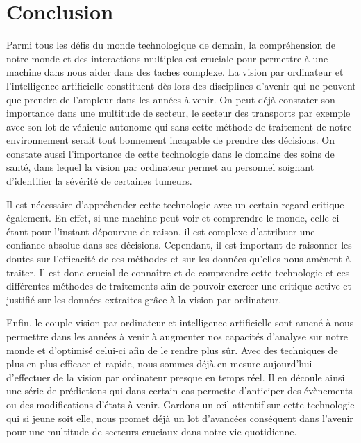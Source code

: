 \documentclass[a4paper,12pt]{article} %
\begin{document}
\section{Conclusion} %
Parmi tous les défis du monde technologique de demain, la compréhension de notre monde et des interactions multiples est cruciale pour permettre à une machine dans nous aider dans des taches complexe. La vision par ordinateur et l’intelligence artificielle constituent dès lors des disciplines d’avenir qui ne peuvent que prendre de l’ampleur dans les années à venir. On peut déjà constater son importance dans une multitude de secteur, le secteur des transports par exemple avec son lot de véhicule autonome qui sans cette méthode de traitement de notre environnement serait tout bonnement incapable de prendre des décisions. On constate aussi l’importance de cette technologie dans le domaine des soins de santé, dans lequel la vision par ordinateur permet au personnel soignant d’identifier la sévérité de certaines tumeurs. \newline
\par
	Il est nécessaire d’appréhender cette technologie avec un certain regard critique également. En effet, si une machine peut voir et comprendre le monde, celle-ci étant pour l’instant dépourvue de raison, il est complexe d’attribuer une confiance absolue dans ses décisions. Cependant, il est important de raisonner les doutes sur l’efficacité de ces méthodes et sur les données qu’elles nous amènent à traiter. Il est donc crucial de connaître et de comprendre cette technologie et ces différentes méthodes de traitements afin de pouvoir exercer une critique active et justifié sur les données extraites grâce à la vision par ordinateur. \newline
\par
	Enfin, le couple vision par ordinateur et intelligence artificielle sont amené à nous permettre dans les années à venir à augmenter nos capacités d’analyse sur notre monde et d’optimisé celui-ci afin de le rendre plus sûr. Avec des techniques de plus en plus efficace et rapide, nous sommes déjà en mesure aujourd’hui d’effectuer de la vision par ordinateur presque en temps réel. Il en découle ainsi une série de prédictions qui dans certain cas permette d’anticiper des évènements ou des modifications d’états à venir. Gardons un œil attentif sur cette technologie qui si jeune soit elle, nous promet déjà un lot d’avancées conséquent dans l’avenir pour une multitude de secteurs cruciaux dans notre vie quotidienne. 
\newpage

\nocite {*}

\end{document}
